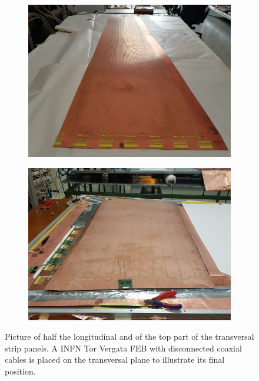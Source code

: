     \begin{figure}[H]
		\begin{subfigure}{.5\linewidth}
		    \centering
			\includegraphics[width = \linewidth]{fig/chapt6/INFN-FEB-Longitudinal.png}
			\caption{\label{fig:INFN_StripPic:A}}
		\end{subfigure}
		\begin{subfigure}{.5\linewidth}
		    \centering
			\includegraphics[width = \linewidth]{fig/chapt6/INFN-FEB-Transversal.png}
			\caption{\label{fig:INFN_StripPic:B}}
		\end{subfigure}
		\caption{\label{fig:INFN_StripPic} Picture of half the longitudinal  and of the top part of the transversal  strip panels. A INFN Tor Vergata FEB with disconnected coaxial cables is placed on the transversal plane to illustrate its final position.}
    \end{figure}
	 
